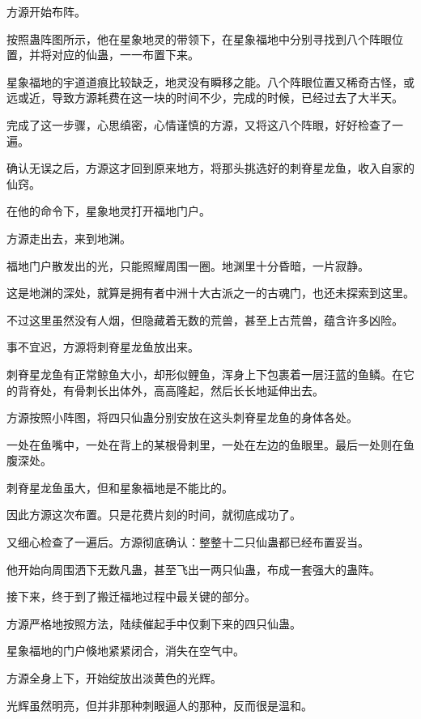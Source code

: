 
\begin{this_body}

方源开始布阵。

按照蛊阵图所示，他在星象地灵的带领下，在星象福地中分别寻找到八个阵眼位置，并将对应的仙蛊，一一布置下来。

星象福地的宇道道痕比较缺乏，地灵没有瞬移之能。八个阵眼位置又稀奇古怪，或远或近，导致方源耗费在这一块的时间不少，完成的时候，已经过去了大半天。

完成了这一步骤，心思缜密，心情谨慎的方源，又将这八个阵眼，好好检查了一遍。

确认无误之后，方源这才回到原来地方，将那头挑选好的刺脊星龙鱼，收入自家的仙窍。

在他的命令下，星象地灵打开福地门户。

方源走出去，来到地渊。

福地门户散发出的光，只能照耀周围一圈。地渊里十分昏暗，一片寂静。

这是地渊的深处，就算是拥有者中洲十大古派之一的古魂门，也还未探索到这里。

不过这里虽然没有人烟，但隐藏着无数的荒兽，甚至上古荒兽，蕴含许多凶险。

事不宜迟，方源将刺脊星龙鱼放出来。

刺脊星龙鱼有正常鲸鱼大小，却形似鲤鱼，浑身上下包裹着一层汪蓝的鱼鳞。在它的背脊处，有骨刺长出体外，高高隆起，然后长长地延伸出去。

方源按照小阵图，将四只仙蛊分别安放在这头刺脊星龙鱼的身体各处。

一处在鱼嘴中，一处在背上的某根骨刺里，一处在左边的鱼眼里。最后一处则在鱼腹深处。

刺脊星龙鱼虽大，但和星象福地是不能比的。

因此方源这次布置。只是花费片刻的时间，就彻底成功了。

又细心检查了一遍后。方源彻底确认：整整十二只仙蛊都已经布置妥当。

他开始向周围洒下无数凡蛊，甚至飞出一两只仙蛊，布成一套强大的蛊阵。

接下来，终于到了搬迁福地过程中最关键的部分。

方源严格地按照方法，陆续催起手中仅剩下来的四只仙蛊。

星象福地的门户倏地紧紧闭合，消失在空气中。

方源全身上下，开始绽放出淡黄色的光辉。

光辉虽然明亮，但并非那种刺眼逼人的那种，反而很是温和。


\end{this_body}
